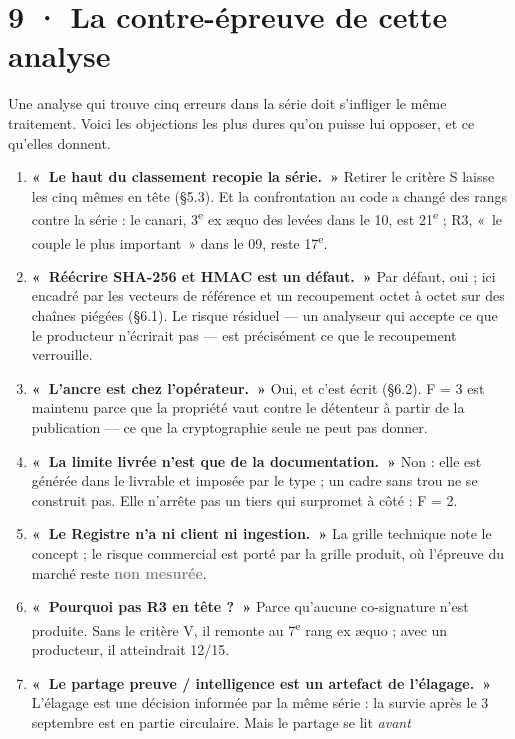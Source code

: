 \documentclass[10pt]{article}
\newcommand{\nm}[1]{\textcolor{grey}{\textbf{#1}}}
\begin{document}
\section{9 · La contre-épreuve de cette analyse}

Une analyse qui trouve cinq erreurs dans la série doit s'infliger le même traitement. Voici les objections les plus
dures qu'on puisse lui opposer, et ce qu'elles donnent.

\begin{enumerate}[leftmargin=1.5em,itemsep=2.5pt,topsep=2pt]
\item \textbf{«~Le haut du classement recopie la série.~»} Retirer le critère S laisse les cinq mêmes en tête (§5.3).
Et la confrontation au code a changé des rangs contre la série : le canari, 3\textsuperscript{e} ex æquo des levées
dans le 10, est 21\textsuperscript{e} ; R3, «~le couple le plus important~» dans le 09, reste 17\textsuperscript{e}.
\item \textbf{«~Réécrire SHA-256 et HMAC est un défaut.~»} Par défaut, oui ; ici encadré par les vecteurs de
référence et un recoupement octet à octet sur des chaînes piégées (§6.1). Le risque résiduel --- un analyseur qui
accepte ce que le producteur n'écrirait pas --- est précisément ce que le recoupement verrouille.
\item \textbf{«~L'ancre est chez l'opérateur.~»} Oui, et c'est écrit (§6.2). F = 3 est maintenu parce que la
propriété vaut contre le détenteur à partir de la publication --- ce que la cryptographie seule ne peut pas donner.
\item \textbf{«~La limite livrée n'est que de la documentation.~»} Non : elle est générée dans le livrable et imposée
par le type ; un cadre sans trou ne se construit pas. Elle n'arrête pas un tiers qui surpromet à côté : F = 2.
\item \textbf{«~Le Registre n'a ni client ni ingestion.~»} La grille technique note le concept ; le risque commercial
est porté par la grille produit, où l'épreuve du marché reste \nm{non mesurée}.
\item \textbf{«~Pourquoi pas R3 en tête ?~»} Parce qu'aucune co-signature n'est produite. Sans le critère V, il
remonte au 7\textsuperscript{e} rang ex æquo ; avec un producteur, il atteindrait 12/15.
\item \textbf{«~Le partage preuve / intelligence est un artefact de l'élagage.~»} L'élagage est une décision informée
par la même série : la survie après le 3 septembre est en partie circulaire. Mais le partage se lit \emph{avant}

\end{enumerate}
\end{document}
